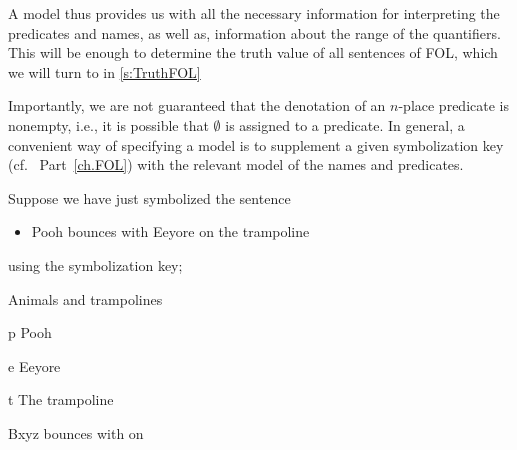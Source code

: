 %	
%	
	
A model thus provides us with all the necessary information for interpreting the predicates and names, as well as, information about the range of the quantifiers. This will be enough to determine the truth value of all sentences of FOL, which we will turn to in \ref{s:TruthFOL}

Importantly, we are not guaranteed that the denotation of an $n$-place predicate is nonempty, i.e., it is possible that $\emptyset$ is assigned to a predicate. In general, a convenient way of specifying a model is to supplement a given symbolization key (cf.~ Part~\ref{ch.FOL}) with the relevant model of the names and predicates.

Suppose we have just symbolized the sentence
\begin{itemize}
\item Pooh bounces with Eeyore on the trampoline
\end{itemize}
using the symbolization key;
\begin{ekey}
\item[\text{domain}]Animals and trampolines
\item[p]Pooh
\item[e]Eeyore
\item[t]The trampoline
\item[Bxyz] bounces with  on 
\end{ekey}


